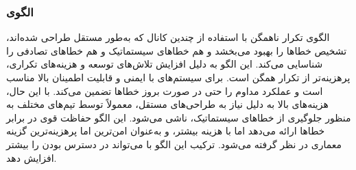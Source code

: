 \subsubsection{الگوی }
\label{archSafeHeteroRedundancySec}
\begin{RTL}
الگوی تکرار ناهمگن با استفاده از چندین کانال که به‌طور مستقل طراحی شده‌اند،
تشخیص خطاها را بهبود می‌بخشد و هم خطاهای سیستماتیک و
هم خطاهای تصادفی را شناسایی می‌کند. این الگو به دلیل افزایش تلاش‌های
توسعه و هزینه‌های تکراری، پرهزینه‌تر از تکرار همگن است. برای
سیستم‌های با ایمنی و قابلیت اطمینان بالا مناسب است
و عملکرد مداوم را حتی در صورت بروز خطاها تضمین می‌کند. با این حال،
هزینه‌های بالا به دلیل نیاز به طراحی‌های مستقل، معمولاً توسط تیم‌های مختلف
به منظور جلوگیری از خطاهای سیستماتیک، ناشی می‌شود. این الگو حفاظت
قوی در برابر خطاها ارائه می‌دهد اما با هزینه بیشتر، و به‌عنوان امن‌ترین اما
پرهزینه‌ترین گزینه معماری در نظر گرفته می‌شود.
ترکیب این الگو با  می‌تواند
در دسترس بودن را بیشتر افزایش دهد.
\end{RTL}